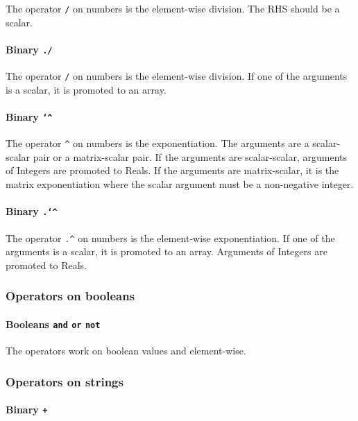 \documentclass[10pt,b5paper]{article}
\begin{document}
The operator \verb'/' on numbers is the element-wise division.  The
RHS should be a scalar.

\paragraph{Binary {\tt{}./}}

The operator \verb'/' on numbers is the element-wise division.  If one
of the arguments is a scalar, it is promoted to an array.

\paragraph{Binary {\tt{}\char`\^}}

The operator \verb'^' on numbers is the exponentiation.  The arguments
are a scalar-scalar pair or a matrix-scalar pair.  If the arguments
are scalar-scalar, arguments of Integers are promoted to Reals.  If
the arguments are matrix-scalar, it is the matrix exponentiation where
the scalar argument must be a non-negative integer.

\paragraph{Binary {\tt{}.\char`\^}}

The operator \verb'.^' on numbers is the element-wise exponentiation.
If one of the arguments is a scalar, it is promoted to an array.
Arguments of Integers are promoted to Reals.

\subsubsection*{Operators on booleans}

\paragraph{Booleans {\tt{}and} {\tt{}or} {\tt{}not}}

The operators work on boolean values and element-wise.

\subsubsection*{Operators on strings}

\paragraph{Binary {\tt{}+}}
\end{document}
